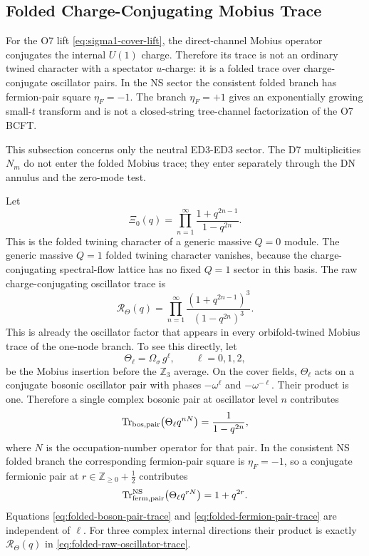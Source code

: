 \documentclass[11pt]{article}
\newcommand{\Z}{\mathbb{Z}}
\newcommand{\NS}{\mathrm{NS}}
\newcommand{\orient}{\Omega_\sigma}
\begin{document}
\subsection{Folded Charge-Conjugating Mobius Trace}

For the O7 lift \eqref{eq:sigma1-cover-lift}, the direct-channel Mobius operator conjugates
the internal \(U(1)\) charge.  Therefore its trace is not an ordinary twined character with a
spectator \(u\)-charge: it is a folded trace over charge-conjugate oscillator pairs.  In the
NS sector the consistent folded branch has fermion-pair square \(\eta_F=-1\).  The branch
\(\eta_F=+1\) gives an exponentially growing small-\(t\) transform and is not a closed-string
tree-channel factorization of the O7 BCFT.

This subsection concerns only the neutral ED3-ED3 sector. The D7 multiplicities \(N_m\) do not
enter the folded Mobius trace; they enter separately through the DN annulus and the zero-mode
test.

Let
\begin{equation}
  \Xi_0(q)
  =
  \prod_{n=1}^{\infty}
  \frac{1+q^{2n-1}}{1-q^{2n}} .
  \label{eq:folded-q0-character}
\end{equation}
This is the folded twining character of a generic massive \(Q=0\) module.  The generic massive
\(Q=1\) folded twining character vanishes, because the charge-conjugating spectral-flow lattice
has no fixed \(Q=1\) sector in this basis.  The raw charge-conjugating oscillator trace is
\begin{equation}
  \mathcal R_\Theta(q)
  =
  \prod_{n=1}^{\infty}
  \frac{(1+q^{2n-1})^3}{(1-q^{2n})^3}.
  \label{eq:folded-raw-oscillator-trace}
\end{equation}
This is already the oscillator factor that appears in every orbifold-twined Mobius trace of the
one-node branch. To see this directly, let
\begin{equation}
  \Theta_\ell=\orient\,g^\ell,
  \qquad \ell=0,1,2,
  \label{eq:theta-ell-definition}
\end{equation}
be the Mobius insertion before the \(\Z_3\) average. On the cover fields,
\(\Theta_\ell\) acts on a conjugate bosonic oscillator pair with phases
\(-\omega^\ell\) and \(-\omega^{-\ell}\). Their product is one. Therefore a single complex
bosonic pair at oscillator level \(n\) contributes
\begin{equation}
  \operatorname{Tr}_{\rm bos,pair}\!\left(\Theta_\ell q^{nN}\right)
  =
  \frac{1}{1-q^{2n}},
  \label{eq:folded-boson-pair-trace}
\end{equation}
where \(N\) is the occupation-number operator for that pair. In the consistent NS folded branch
the corresponding fermion-pair square is \(\eta_F=-1\), so a conjugate fermionic pair at
\(r\in\Z_{\ge0}+\frac12\) contributes
\begin{equation}
  \operatorname{Tr}_{\rm ferm,pair}^{\NS}\!\left(\Theta_\ell q^{rN}\right)
  =
  1+q^{2r}.
  \label{eq:folded-fermion-pair-trace}
\end{equation}
Equations \eqref{eq:folded-boson-pair-trace} and
\eqref{eq:folded-fermion-pair-trace} are independent of \(\ell\). For three complex internal
directions their product is exactly \(\mathcal R_\Theta(q)\) in
\eqref{eq:folded-raw-oscillator-trace}.
\end{document}
